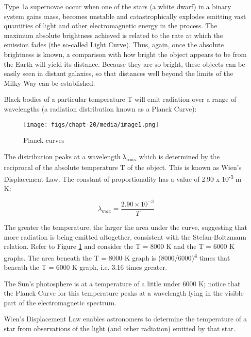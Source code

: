 \documentclass[revision-guide.tex]{subfiles}
\begin{document}
Type 1a supernovae occur when one of the stars (a white dwarf) in a
binary system gains mass, becomes unstable and catastrophically explodes
emitting vast quantities of light and other electromagnetic energy in
the process. The maximum absolute brightness achieved is related to the
rate at which the emission fades (the so-called Light Curve). Thus,
again, once the absolute brightness is known, a comparison with how
bright the object appears to be from the Earth will yield its distance.
Because they are so bright, these objects can be easily seen in distant
galaxies, so that distances well beyond the limits of the Milky Way can
be established.

Black bodies of a particular temperature T will emit radiation over a
range of wavelengths (a radiation distribution known as a Planck Curve):

\begin{figure}[h]
\texttt{[image: figs/chapt-20/media/image1.png]}
\caption{Planck curves}
\label{plank-curves}
\end{figure}

The distribution peaks at a wavelength λ\textsubscript{max} which is
determined by the reciprocal of the absolute temperature T of the
object. This is known as Wien's Displacement Law. The constant of
proportionality has a value of 2.90 x 10\textsuperscript{-3} m K:

\[\lambda_{max} = \frac{2.90 \times 10^{-3}} {T}\]

The greater the temperature, the larger the area under the curve,
suggesting that more radiation is being emitted altogether, consistent
with the Stefan-Boltzmann relation. Refer to Figure \ref{plank-curves} and consider the T
= 8000 K and the T = 6000 K graphs. The area beneath the T = 8000 K
graph is (8000/6000)\textsuperscript{4} times that beneath the T = 6000
K graph, i.e. 3.16 times greater.

The Sun's photosphere is at a temperature of a little under 6000 K;
notice that the Planck Curve for this temperature peaks at a wavelength
lying in the visible part of the electromagnetic spectrum.

Wien's Displacement Law enables astronomers to determine the temperature
of a star from observations of the light (and other radiation) emitted
by that star.
\end{document}
